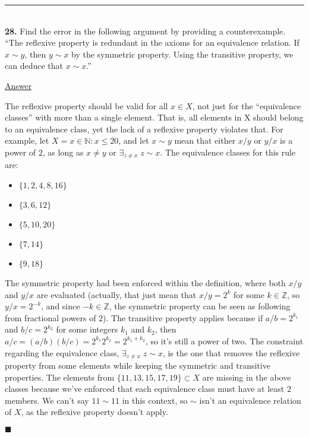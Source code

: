 \documentclass{article}[10pt]
\newenvironment{exercise}[1]
    {\noindent\rule{2cm}{0.4pt} \\
     \textbf{#1.}}
    {}
\newcommand{\answer}{

  \underline{Answer}

}
\newcommand{\qed}{

\hfill\ensuremath{\blacksquare}

}
\begin{document}
\begin{exercise}{28}
  Find the error in the following argument
  by providing a counterexample.
  ``The reflexive property is redundant in the axioms
    for an equivalence relation.
    If $x \sim y$, then $y \sim x$ by the symmetric property.
    Using the transitive property, we can deduce that $x \sim x$.''
  \answer
  The reflexive property should be valid for all $x \in X$,
  not just for the ``equivalence classes''
  with more than a single element.
  That is, all elements in X should belong to an equivalence class,
  yet the lack of a reflexive property violates that.
  For example, let $X = {x \in \mathds{N} : x \le 20}$,
  and let $x \sim y$ mean
  that either $x / y$ or $y / x$ is a power of $2$,
  as long as $x \ne y$ or $\exists_{z \ne x} \; z \sim x$.
  The equivalence classes for this rule are:
  \begin{itemize}
    \item $\{1, 2, 4, 8, 16\}$
    \item $\{3, 6, 12\}$
    \item $\{5, 10, 20\}$
    \item $\{7, 14\}$
    \item $\{9, 18\}$
  \end{itemize}
  The symmetric property had been enforced within the definition,
  where both $x / y$ and $y / x$  are evaluated
  (actually, that just mean that $x / y = 2^k$
   for some $k \in \mathds{Z}$,
   so $y / x = 2^{-k}$, and since $-k \in \mathds{Z}$,
   the symmetric property can be seen
   as following from fractional powers of $2$).
  The transitive property applies
  because if $a / b = 2^{k_1}$ and $b / c = 2^{k_2}$
  for some integers $k_1$ and $k_2$,
  then $a / c = (a / b) (b / c) = 2^{k_1} 2^{k_2} = 2^{k_1 + k_2}$,
  so it's still a power of two.
  The constraint regarding the equivalence class,
  $\exists_{z \ne x} \; z \sim x$,
  is the one that removes the reflexive property
  from some elements
  while keeping the symmetric and transitive properties.
  The elements from $\{11, 13, 15, 17, 19\} \subset X$ are missing
  in the above classes
  because we've enforced that each equivalence class
  must have at least $2$ members.
  We can't say $11 \sim 11$ in this context,
  so $\sim$ isn't an equivalence relation of $X$,
  as the reflexive property doesn't apply.
  \qed
\end{exercise}
\end{document}
